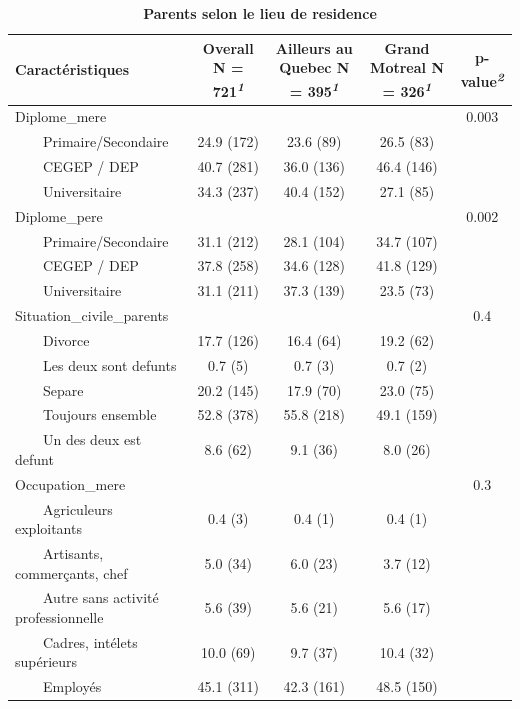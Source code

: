 \documentclass[
]{article}
\begin{document}
\newpage
\begin{table}[!t]
\caption{\label{tab:unnamed-chunk-19}\textbf{Parents selon le lieu de residence}} 
\fontsize{12.0pt}{14.4pt}\selectfont
\begin{tabular*}{\linewidth}{@{\extracolsep{\fill}}lcccc}
\toprule
\textbf{Caractéristiques} & \textbf{Overall}  N = 721\textsuperscript{\textit{1}} & \textbf{Ailleurs au Quebec}  N = 395\textsuperscript{\textit{1}} & \textbf{Grand Motreal}  N = 326\textsuperscript{\textit{1}} & \textbf{p-value}\textsuperscript{\textit{2}} \\ 
\midrule\addlinespace[2.5pt]
Diplome\_mere &  &  &  & 0.003 \\ 
    Primaire/Secondaire & 24.9 (172) & 23.6 (89) & 26.5 (83) &  \\ 
    CEGEP / DEP & 40.7 (281) & 36.0 (136) & 46.4 (146) &  \\ 
    Universitaire & 34.3 (237) & 40.4 (152) & 27.1 (85) &  \\ 
Diplome\_pere &  &  &  & 0.002 \\ 
    Primaire/Secondaire & 31.1 (212) & 28.1 (104) & 34.7 (107) &  \\ 
    CEGEP / DEP & 37.8 (258) & 34.6 (128) & 41.8 (129) &  \\ 
    Universitaire & 31.1 (211) & 37.3 (139) & 23.5 (73) &  \\ 
Situation\_civile\_parents &  &  &  & 0.4 \\ 
    Divorce & 17.7 (126) & 16.4 (64) & 19.2 (62) &  \\ 
    Les deux sont defunts & 0.7 (5) & 0.7 (3) & 0.7 (2) &  \\ 
    Separe & 20.2 (145) & 17.9 (70) & 23.0 (75) &  \\ 
    Toujours ensemble & 52.8 (378) & 55.8 (218) & 49.1 (159) &  \\ 
    Un des deux est defunt & 8.6 (62) & 9.1 (36) & 8.0 (26) &  \\ 
Occupation\_mere &  &  &  & 0.3 \\ 
    Agriculeurs exploitants & 0.4 (3) & 0.4 (1) & 0.4 (1) &  \\ 
    Artisants, commerçants, chef & 5.0 (34) & 6.0 (23) & 3.7 (12) &  \\ 
    Autre sans activité professionnelle & 5.6 (39) & 5.6 (21) & 5.6 (17) &  \\ 
    Cadres, intélets supérieurs & 10.0 (69) & 9.7 (37) & 10.4 (32) &  \\ 
    Employés & 45.1 (311) & 42.3 (161) & 48.5 (150) &  \\ 

\end{tabular*}
\end{table}
\end{document}
